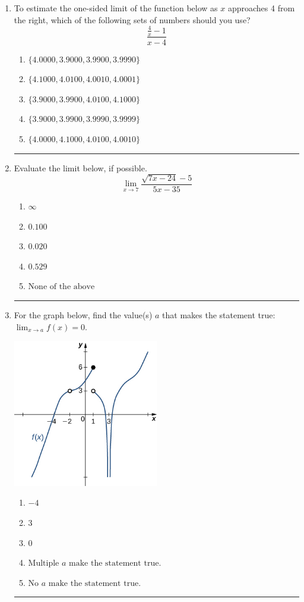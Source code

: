 \documentclass[14pt]{extbook}
\newcommand{\litem}[1]{\item#1\hspace*{-1cm}\rule{\textwidth}{0.4pt}}
\begin{document}
\begin{enumerate}
{\begin{enumerate}[label=\Alph*.]
\end{enumerate} }
\litem{
To estimate the one-sided limit of the function below as $x$ approaches 4 from the right, which of the following sets of numbers should you use?\[ \frac{\frac{4}{x} - 1}{x - 4} \]\begin{enumerate}[label=\Alph*.]
\item \( \{ 4.0000, 3.9000, 3.9900, 3.9990 \} \)
\item \( \{ 4.1000, 4.0100, 4.0010, 4.0001 \} \)
\item \( \{ 3.9000, 3.9900, 4.0100, 4.1000 \} \)
\item \( \{ 3.9000, 3.9900, 3.9990, 3.9999 \} \)
\item \( \{ 4.0000, 4.1000, 4.0100, 4.0010 \} \)

\end{enumerate} }
\litem{
Evaluate the limit below, if possible.\[ \lim_{x \rightarrow 7} \frac{\sqrt{7x - 24} - 5}{5x - 35} \]\begin{enumerate}[label=\Alph*.]
\item \( \infty \)
\item \( 0.100 \)
\item \( 0.020 \)
\item \( 0.529 \)
\item \( \text{None of the above} \)

\end{enumerate} }
\litem{
For the graph below, find the value(s) $a$ that makes the statement true: $ \displaystyle \lim_{x \rightarrow a} f(x) = 0$.
\begin{center}
    \includegraphics[width=0.5\textwidth]{../Figures/evaluateLimitGraphicallyCopyC.png}
\end{center}
\begin{enumerate}[label=\Alph*.]
\item \( -4 \)
\item \( 3 \)
\item \( 0 \)
\item \( \text{Multiple } a \text{ make the statement true}. \)
\item \( \text{No } a \text{ make the statement true}. \)


\end{enumerate}}
\end{enumerate}
\end{document}

